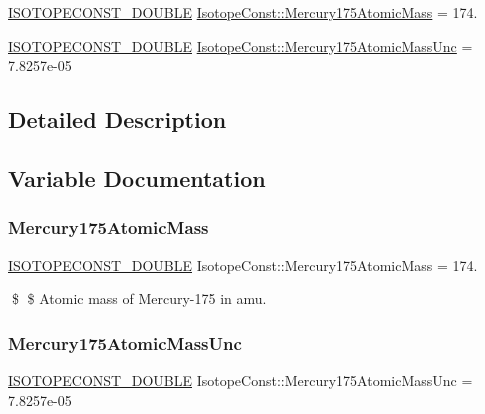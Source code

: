 \begin{DoxyCompactItemize}
\item 
\mbox{\hyperlink{group___isotope_const-_macros_ga8f45a7272ce02c0b4c65c44636ed719a}{I\+S\+O\+T\+O\+P\+E\+C\+O\+N\+S\+T\+\_\+\+D\+O\+U\+B\+LE}} \mbox{\hyperlink{group___isotope_const-_mercury-_hg175_ga629d3154fa07711ca6f96495da68beb0}{Isotope\+Const\+::\+Mercury175\+Atomic\+Mass}} = 174.
\item 
\mbox{\hyperlink{group___isotope_const-_macros_ga8f45a7272ce02c0b4c65c44636ed719a}{I\+S\+O\+T\+O\+P\+E\+C\+O\+N\+S\+T\+\_\+\+D\+O\+U\+B\+LE}} \mbox{\hyperlink{group___isotope_const-_mercury-_hg175_ga8510d373e630f39bed5c64b3eab2de81}{Isotope\+Const\+::\+Mercury175\+Atomic\+Mass\+Unc}} = 7.\+8257e-\/05
\end{DoxyCompactItemize}


\subsection{Detailed Description}


\subsection{Variable Documentation}
\mbox{\label{group___isotope_const-_mercury-_hg175_ga629d3154fa07711ca6f96495da68beb0}} 
\subsubsection{\texorpdfstring{Mercury175\+Atomic\+Mass}{Mercury175AtomicMass}}
{\footnotesize\ttfamily \mbox{\hyperlink{group___isotope_const-_macros_ga8f45a7272ce02c0b4c65c44636ed719a}{I\+S\+O\+T\+O\+P\+E\+C\+O\+N\+S\+T\+\_\+\+D\+O\+U\+B\+LE}} Isotope\+Const\+::\+Mercury175\+Atomic\+Mass = 174.}

\$ \$ Atomic mass of Mercury-\/175 in amu. \mbox{\label{group___isotope_const-_mercury-_hg175_ga8510d373e630f39bed5c64b3eab2de81}} 
\subsubsection{\texorpdfstring{Mercury175\+Atomic\+Mass\+Unc}{Mercury175AtomicMassUnc}}
{\footnotesize\ttfamily \mbox{\hyperlink{group___isotope_const-_macros_ga8f45a7272ce02c0b4c65c44636ed719a}{I\+S\+O\+T\+O\+P\+E\+C\+O\+N\+S\+T\+\_\+\+D\+O\+U\+B\+LE}} Isotope\+Const\+::\+Mercury175\+Atomic\+Mass\+Unc = 7.\+8257e-\/05}

